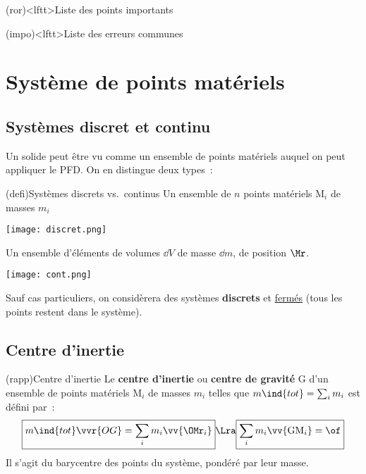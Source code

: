 \documentclass[../../main/main.tex]{subfiles}
\begin{document}
\begin{boxes}
	\begin{tcb}(ror)<lftt>{Liste des points importants}
	\end{tcb}
	\begin{tcb}(impo)<lftt>{Liste des erreurs communes}
	\end{tcb}
\end{boxes}
\vspace*{\fill}
\newpage


\section{Système de points matériels}
\subsection{Systèmes discret et continu}
Un solide peut être vu comme un ensemble de points matériels auquel on peut
appliquer le PFD. On en distingue deux types~:
\begin{tcb*}[sidebyside](defi){Systèmes discrets vs.\ continus}
	Un ensemble de $n$ points matériels M$_i$ de masses $m_i$
	\begin{center}
		\texttt{[image: discret.png]}
	\end{center}
	\tcblower
	Un ensemble d'éléments de volumes $\dd{V}$ de masse $\dd{m}$, de position
	$\Mr$.
	\begin{center}
		\texttt{[image: cont.png]}
	\end{center}
\end{tcb*}

Sauf cas particuliers, on considèrera des systèmes \textbf{discrets} et
\ul{fermés} (tous les points restent dans le système).

\subsection{Centre d'inertie}
\begin{tcb*}(rapp){Centre d'inertie}
	Le \textbf{centre d'inertie} ou \textbf{centre de gravité} G d'un ensemble
	de points matériels M$_i$ de masses $m_i$ telles que $m\ind{tot} = \sum_i
		m_i$ est défini par~:
	\[
		\boxed{m\ind{tot}\vvr{OG} = \sum_i m_i \vv{{\OMr}_i}}
		\Lra
		\boxed{\sum_i m_i\vv{{\rm GM}_i} = \of}
	\]
	Il s'agit du barycentre des points du système, pondéré par leur masse.
\end{tcb*}
\end{document}
